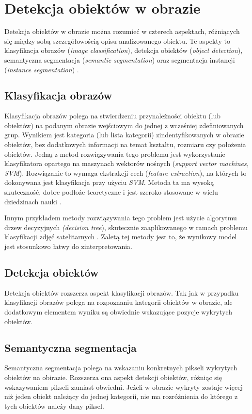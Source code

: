 \section{Detekcja obiektów w obrazie}
\label{sec:typy_detekcji}

Detekcja obiektów w obrazie można rozumieć w czterech aspektach, różniących się między sobą szczegółowością opisu analizowanego obiektu. Te aspekty to klasyfikacja obrazów (\textit{image classification}), detekcja obiektów (\textit{object detection}), semantyczna segmentacja (\textit{semantic segmentation}) oraz segmentacja instancji (\textit{instance segmentation}) \cite{survey-of-object-classification}.

\subsection*{Klasyfikacja obrazów}
Klasyfikacja obrazów polega na stwierdzeniu przynależności obiektu (lub obiektów) na podanym obrazie wejściowym do jednej z wcześniej zdefiniowanych grup. Wynikiem jest kategoria (lub lista kategorii) zindentyfikowanych w obrazie obiektów, bez dodatkowych informacji na temat kształtu, rozmiaru czy położenia obiektów. Jedną z metod rozwiązywania tego problemu jest wykorzystanie klasyfikatora opartego na maszynach wektorów nośnych (\textit{support vector machines, SVM}). Rozwiązanie to wymaga ekstrakcji cech (\textit{feature extraction}), na których to dokonywana jest klasyfikacja przy użyciu \textit{SVM}. Metoda ta ma wysoką skuteczność, dobre podłoże teoretyczne i jest szeroko stosowane w wielu dziedzinach nauki \cite{analysis-image-classification}.

Innym przykładem metody rozwiązywania tego problem jest użycie algorytmu drzew decyzyjnych \textit{(decision tree}), skutecznie zaaplikowanego w ramach problemu klasyfikacji zdjęć satelitarnych \cite{decision-image-classifier}. Zaletą tej metody jest to, że wynikowy model jest stosunkowo łatwy do zinterpretowania.
\subsection*{Detekcja obiektów}
Detekcja obiektów rozszerza aspekt klasyfikacji obrazów. Tak jak w przypadku klasyfikacji obrazów polega na rozpoznaniu kategorii obiektów w obrazie, ale dodatkowym elementem wyniku są obwiednie wskazujące pozycje wykrytych obiektów.
\subsection*{Semantyczna segmentacja}
Semantyczna segmentacja polega na wskazaniu konkretnych pikseli wykrytych obiektów na obirazie. Rozszerza ona aspekt detekcji obiektów, różniąc się wskazywaniem pikseli zamiast obwiedni. Jeżeli w obrazie wykryty zostaje więcej niż jeden obiekt należący do jednej kategorii, nie ma rozróżnienia do którego z tych obiektów należy dany piksel.
